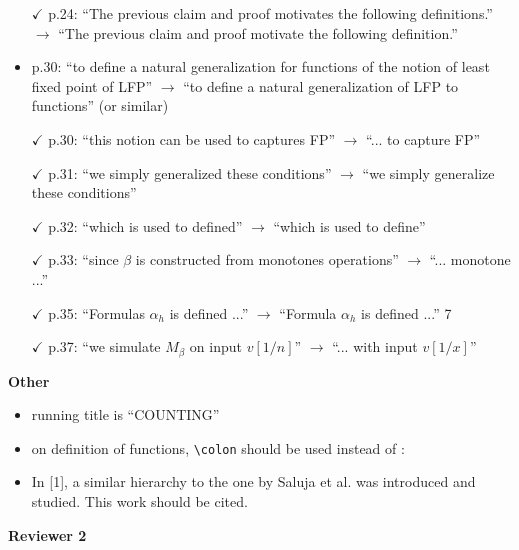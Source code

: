 \begin{itemize}
	\item[$\checkmark$] p.24: ``The previous claim and proof motivates the following definitions.'' $\to$ ``The previous
	claim and proof motivate the following definition.''
	\item p.30: ``to define a natural generalization for functions of the notion of least fixed point of
	LFP'' $\to$ ``to define a natural generalization of LFP to functions'' (or similar)
	\item[$\checkmark$] p.30: ``this notion can be used to captures FP'' $\to$ ``... to capture FP''
	\item[$\checkmark$] p.31: ``we simply generalized these conditions'' $\to$ ``we simply generalize these conditions''
	\item[$\checkmark$] p.32: ``which is used to defined'' $\to$ ``which is used to define''
	\item[$\checkmark$] p.33: ``since $\beta$ is constructed from monotones operations'' $\to$ ``... monotone ...''
	\item[$\checkmark$] p.35: ``Formulas $\alpha_h$ is defined ...'' $\to$ ``Formula $\alpha_h$ is defined ...''
	7
	\item[$\checkmark$] p.37: ``we simulate $M_\beta$ on input $v[1/n]$'' $\to$ ``... with input $v[1/x]$''
\end{itemize}
\vspace{1em}
{\bf Other}
\begin{itemize}
	\setlength\itemsep{0.5em}
	\item running title is ``COUNTING''
	\item on definition of functions, \verb|\colon| should be used instead of :
	\item In [1], a similar hierarchy to the one by Saluja et al. was introduced and studied. This work
	should be cited.
\end{itemize}

\bigskip

{\bf Reviewer 2}


